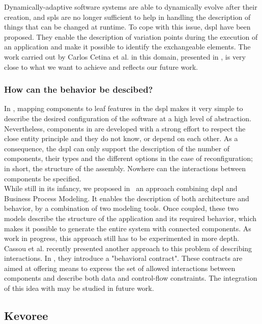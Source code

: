 Dynamically-adaptive software systems are able to dynamically evolve after their creation, and \gls{spl}s are no longer sufficient to help in handling the description of things that can be changed at runtime. To cope with this issue, \gls{dspl} have been proposed. They enable the description of variation points during the execution of an application and make it possible to identify the exchangeable elements. The work carried out by Carlos Cetina et al. in this domain, presented in \cite{Cetina:2009}, is very close to what we want to achieve and reflects our future work.\\


\subsubsection{How can the behavior be descibed?}

In \enti{}, mapping components to leaf features in the \gls{dspl} makes it very simple to describe the desired configuration of the software at a high level of abstraction. Nevertheless, components in \enti{} are developed with a strong effort to respect the close entity principle and they do not know, or depend on each other. As a consequence, the \gls{dspl} can only support the description of the number of components, their types and the different options in the case of reconfiguration; in short, the structure of the assembly. Nowhere can the interactions between components be specified.\\

While still in its infancy, we proposed in~\cite{Istoan09a} an approach combining \gls{dspl} and Business Process Modeling. It enables the description of both architecture and behavior, by a combination of two modeling tools. Once coupled, these two models describe the structure of the application and its required behavior, which makes it possible to generate the entire system with connected components. As work in progress, this approach still has to be experimented in more depth.\\
Cassou et al. recently presented another approach to this problem of describing interactions. In \cite{Cassou:2011}, they introduce a "behavioral contract". These contracts are aimed at offering means to express the set of allowed interactions between components and describe both data and control-flow constraints. The integration of this idea with \enti{} may be studied in future work.


\subsection{Kevoree}

